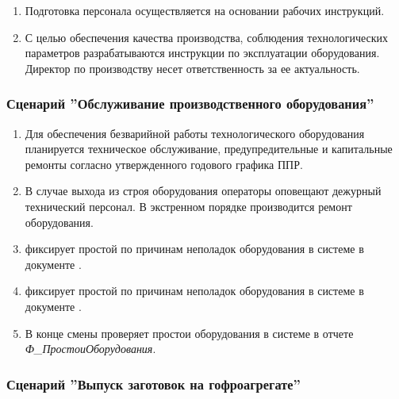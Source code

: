 \begin{enumerate}
\item Подготовка персонала осуществляется на основании рабочих инструкций.
\item 	С целью обеспечения качества производства, соблюдения технологических параметров разрабатываются инструкции по эксплуатации оборудования. Директор по производству несет ответственность за ее актуальность.


\end{enumerate}

\subsubsection{Сценарий ''Обслуживание производственного оборудования''}
\label{bp:production_8}

\begin{enumerate}
\item 	Для обеспечения безварийной работы технологического оборудования планируется техническое обслуживание, предупредительные и капитальные ремонты согласно утвержденного годового графика ППР.
\item 	В случае выхода из строя оборудования операторы оповещают дежурный технический персонал. В экстренном порядке производится ремонт оборудования. 
\item 	\gaoperator фиксирует простой по причинам неполадок оборудования в системе \gofro в документе .
\item 	\operator фиксирует простой по причинам неполадок оборудования в системе \gofro в документе .
\item 	В конце смены \master проверяет простои оборудования в системе \gofro в отчете \textit{Ф\_ПростоиОборудования}.


\end{enumerate}





\subsubsection{Сценарий ''Выпуск заготовок на гофроагрегате''}
\label{bp:production_9}

